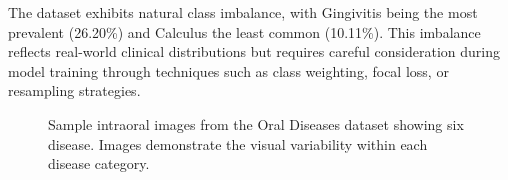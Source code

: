 The dataset exhibits natural class imbalance, with Gingivitis being the most prevalent (26.20\%) and Calculus the least common (10.11\%). This imbalance reflects real-world clinical distributions but requires careful consideration during model training through techniques such as class weighting, focal loss, or resampling strategies.

\begin{figure}[htbp]
\centering
{}
\caption{Sample intraoral images from the Oral Diseases dataset showing six disease. Images demonstrate the visual variability within each disease category.}
\label{fig:dataset_samples}
\end{figure}